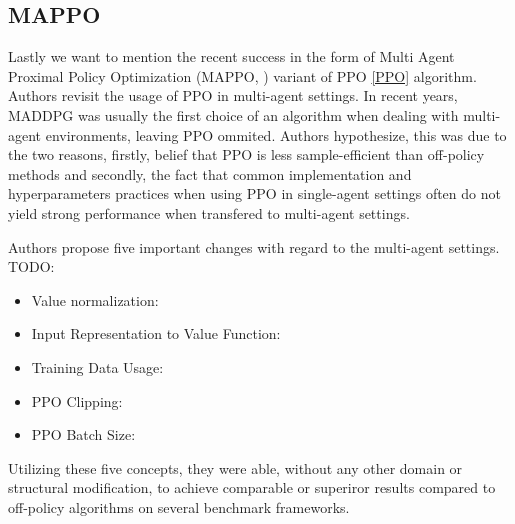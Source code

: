 \subsection*{MAPPO}
Lastly we want to mention the recent success in the form of Multi Agent Proximal Policy Optimization (MAPPO, \cite{MAPPO}) variant of PPO \ref{PPO} algorithm.
Authors revisit the usage of PPO in multi-agent settings.
In recent years, MADDPG was usually the first choice of an algorithm when dealing with multi-agent environments, leaving PPO ommited.
Authors hypothesize, this was due to the two reasons, firstly, belief that PPO is less sample-efficient than off-policy methods and secondly, the fact that common implementation and hyperparameters practices when using PPO in single-agent settings often do not yield strong performance when transfered to multi-agent settings.

Authors propose five important changes with regard to the multi-agent settings.
TODO:
\begin{itemize}
    \item Value normalization: 
    \item Input Representation to Value Function:
    \item Training Data Usage:
    \item PPO Clipping:
    \item PPO Batch Size:
\end{itemize}

Utilizing these five concepts, they were able, without any other domain or structural modification, to achieve comparable or superiror results compared to off-policy algorithms on several benchmark frameworks.   





